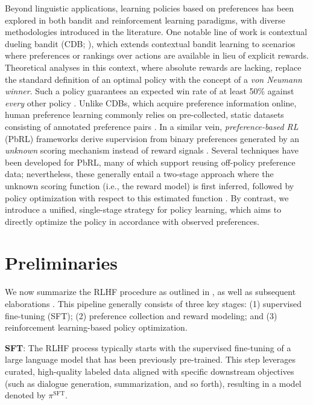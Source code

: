 Beyond linguistic applications, learning policies based on preferences has been explored in both bandit and reinforcement learning paradigms, with diverse methodologies introduced in the literature. One notable line of work is contextual dueling bandit (CDB; \cite{yue2012karmed,dudik2015contextual}), which extends contextual bandit learning to scenarios where preferences or rankings over actions are available in lieu of explicit rewards. Theoretical analyses in this context, where absolute rewards are lacking, replace the standard definition of an optimal policy with the concept of a \textit{von Neumann winner}. Such a policy guarantees an expected win rate of at least 50\% against \textit{every} other policy \citep{dudik2015contextual}. Unlike CDBs, which acquire preference information online, human preference learning commonly relies on pre-collected, static datasets consisting of annotated preference pairs \citep{yan2022human}. In a similar vein, \textit{preference-based RL} (PbRL) frameworks derive supervision from binary preferences generated by an \textit{unknown} scoring mechanism instead of reward signals \citep{BusaFekete2014,ruiz2023dueling}. Several techniques have been developed for PbRL, many of which support reusing off-policy preference data; nevertheless, these generally entail a two-stage approach where the unknown scoring function (i.e., the reward model) is first inferred, followed by policy optimization with respect to this estimated function \citep{jain2013learning,BusaFekete2014,christiano2017deep,sadigh2017active,kupcsik2018learning}. By contrast, we introduce a unified, single-stage strategy for policy learning, which aims to directly optimize the policy in accordance with observed preferences.

\section{Preliminaries}\label{section:prelims}

We now summarize the RLHF procedure as outlined in \citeauthor{ziegler2020finetuning}, as well as subsequent elaborations \citep{stiennon2022learning, bai2022training, ouyang2022training}. This pipeline generally consists of three key stages: (1) supervised fine-tuning (SFT); (2) preference collection and reward modeling; and (3) reinforcement learning-based policy optimization.

\textbf{SFT}: The RLHF process typically starts with the supervised fine-tuning of a large language model that has been previously pre-trained. This step leverages curated, high-quality labeled data aligned with specific downstream objectives (such as dialogue generation, summarization, and so forth), resulting in a model denoted by $\pi^\text{SFT}$.

